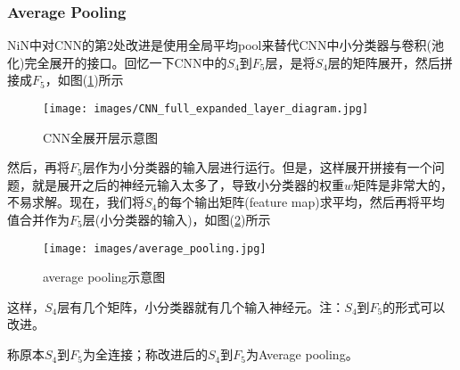         \subsubsection{Average Pooling}
            \par
            NiN\cite{2014.MinLin}中对CNN的第2处改进是使用全局平均pool来替代CNN中小分类器与卷积(池化)完全展开的接口。回忆一下CNN中的$S_4$到$F_5$层，是将$S_4$层的矩阵展开，然后拼接成$F_5$，如图(\ref{fig:CNN全展开层示意图})所示
             \begin{figure}[H]
            \centering
            \texttt{[image: images/CNN\_full\_expanded\_layer\_diagram.jpg]}
            \caption{CNN全展开层示意图}
            \label{fig:CNN全展开层示意图}
            \end{figure}
            然后，再将$F_5$层作为小分类器的输入层进行运行。但是，这样展开拼接有一个问题，就是展开之后的神经元输入太多了，导致小分类器的权重$w$矩阵是非常大的，不易求解。现在，我们将$S_4$的每个输出矩阵(feature map)求平均，然后再将平均值合并作为$F_5$层(小分类器的输入)，如图(\ref{fig:average pooling示意图})所示
             \begin{figure}[H]
            \centering
            \texttt{[image: images/average\_pooling.jpg]}
            \caption{average pooling示意图}
            \label{fig:average pooling示意图}
            \end{figure}
            这样，$S_4$层有几个矩阵，小分类器就有几个输入神经元。注：$S_4$到$F_5$的形式可以改进。
            \par
            称原本$S_4$到$F_5$为全连接；称改进后的$S_4$到$F_5$为Average pooling。
